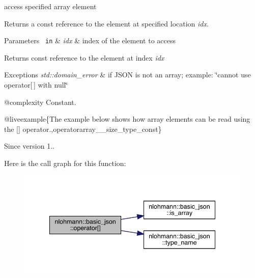 access specified array element 

Returns a const reference to the element at specified location {\itshape idx}.


\begin{DoxyParams}[1]{Parameters}
\mbox{\texttt{ in}}  & {\em idx} & index of the element to access\\
\hline
\end{DoxyParams}
\begin{DoxyReturn}{Returns}
const reference to the element at index {\itshape idx} 
\end{DoxyReturn}

\begin{DoxyExceptions}{Exceptions}
{\em std\+::domain\+\_\+error} & if J\+S\+ON is not an array; example\+: {\ttfamily \char`\"{}cannot use
operator\mbox{[}$\,$\mbox{]} with null\char`\"{}}\\
\hline
\end{DoxyExceptions}
@complexity Constant.

@liveexample\{The example below shows how array elements can be read using the {\ttfamily \mbox{[}\mbox{]}} operator.,operatorarray\+\_\+\+\_\+size\+\_\+type\+\_\+const\}

\begin{DoxySince}{Since}
version 1.. 
\end{DoxySince}
Here is the call graph for this function\+:\nopagebreak
\begin{figure}[H]
\begin{center}
\leavevmode
\includegraphics[width=341pt]{classnlohmann_1_1basic__json_a9cb592cd85c14f3e845e30d51cf17efb_cgraph}
\end{center}
\end{figure}
\mbox{\label{classnlohmann_1_1basic__json_a233b02b0839ef798942dd46157cc0fe6}} 
